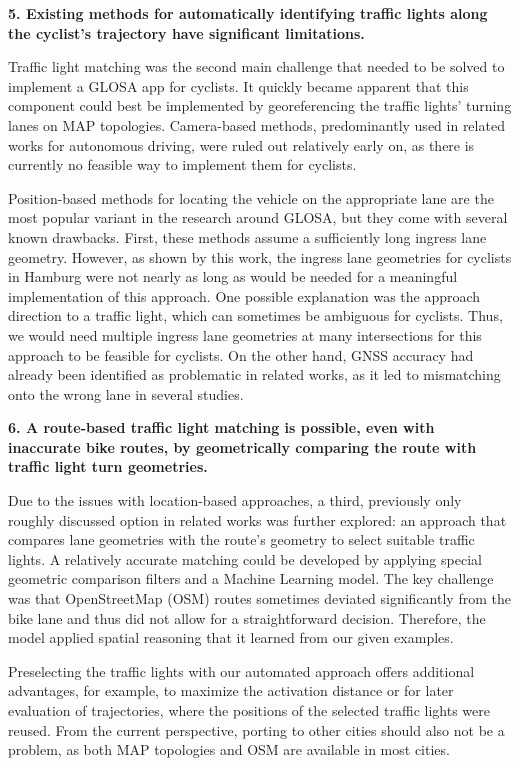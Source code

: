 \textbf{\color{cidarkblue}5. Existing methods for automatically identifying traffic lights along the cyclist's trajectory have significant limitations.} 

Traffic light matching was the second main challenge that needed to be solved to implement a GLOSA app for cyclists. It quickly became apparent that this component could best be implemented by georeferencing the traffic lights' turning lanes on MAP topologies. Camera-based methods, predominantly used in related works for autonomous driving, were ruled out relatively early on, as there is currently no feasible way to implement them for cyclists. 

Position-based methods for locating the vehicle on the appropriate lane are the most popular variant in the research around GLOSA, but they come with several known drawbacks. First, these methods assume a sufficiently long ingress lane geometry. However, as shown by this work, the ingress lane geometries for cyclists in Hamburg were not nearly as long as would be needed for a meaningful implementation of this approach. One possible explanation was the approach direction to a traffic light, which can sometimes be ambiguous for cyclists. Thus, we would need multiple ingress lane geometries at many intersections for this approach to be feasible for cyclists. On the other hand, GNSS accuracy had already been identified as problematic in related works, as it led to mismatching onto the wrong lane in several studies.

\textbf{\color{cidarkblue}6. A route-based traffic light matching is possible, even with inaccurate bike routes, by geometrically comparing the route with traffic light turn geometries.}

Due to the issues with location-based approaches, a third, previously only roughly discussed option in related works was further explored: an approach that compares lane geometries with the route's geometry to select suitable traffic lights. A relatively accurate matching could be developed by applying special geometric comparison filters and a Machine Learning model. The key challenge was that OpenStreetMap (OSM) routes sometimes deviated significantly from the bike lane and thus did not allow for a straightforward decision. Therefore, the model applied spatial reasoning that it learned from our given examples.

Preselecting the traffic lights with our automated approach offers additional advantages, for example, to maximize the activation distance or for later evaluation of trajectories, where the positions of the selected traffic lights were reused. From the current perspective, porting to other cities should also not be a problem, as both MAP topologies and OSM are available in most cities. 

